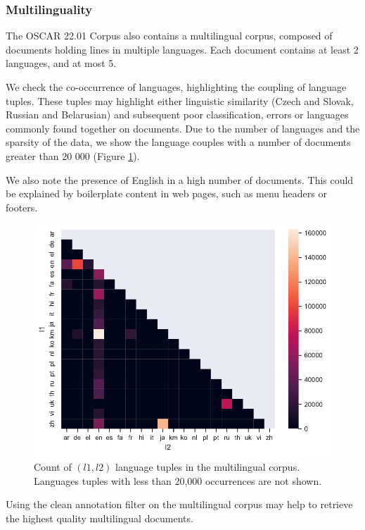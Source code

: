 \subsubsection{Multilinguality}

The OSCAR 22.01 Corpus also contains a multilingual corpus, composed of documents holding lines in multiple languages. Each document contains at least 2 languages, and at most 5.

We check the co-occurrence of languages, highlighting the coupling of language tuples. These tuples may highlight either linguistic similarity (Czech and Slovak, Russian and Belarusian) and subsequent poor classification, errors or languages commonly found together on documents. Due to the number of languages and the sparsity of the data, we show the language couples with a number of documents greater than 20 000 (Figure \ref{multi-confusion}).

We also note the presence of English in a high number of documents. This could be explained by boilerplate content in web pages, such as menu headers or footers.


\begin{figure}[!ht]
    \begin{center}
        \includegraphics[width=0.8\linewidth]{static/media/oscar/towards/multilingual_big}
        \caption{Count of $(l1, l2)$ language tuples in the multilingual corpus. Languages tuples with less than 20,000 occurrences are not shown.}
        \label{multi-confusion}
    \end{center}
\end{figure}

Using the clean annotation filter on the multilingual corpus may help to retrieve the highest quality multilingual documents.

